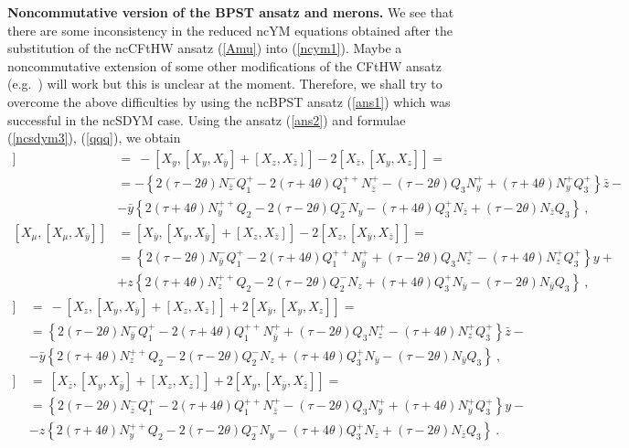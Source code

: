 \documentclass[a4paper,11pt]{article}
\numberwithin{equation}{section}
\def\th{\theta}
\def\m{\mu}
\newcommand{\zb}{{\bar{z}}}
\newcommand{\yb}{{\bar{y}}}
\begin{document}
{\bf Noncommutative version of the BPST ansatz and merons.}
We see that there are some inconsistency in the reduced ncYM equations obtained
after the substitution of the ncCFtHW ansatz (\ref{Amu}) into (\ref{ncym1}).
Maybe a noncommutative extension of some other modifications of the
CFtHW ansatz (e.g.~\cite{Popov:qs}) will work but this is 
unclear at the moment. Therefore, we shall try to overcome the above difficulties by using
the  ncBPST ansatz (\ref{ans1}) which was successful in the ncSDYM case.
Using the ansatz (\ref{ans2}) and formulae (\ref{ncsdym3}), (\ref{qqq}), we obtain 
\begin{align}
[X_\m , [X_\m , X_y]]\ &=\  -[ X_y , [X_y , X_\yb] + [X_z , X_\zb] ] - 2[X_\zb ,[X_y , X_z]]=
 \nonumber\\[8pt]
 &= -\left\{ 2(\tau -2\th) N^-_\zb Q_1^+ - 2(\tau + 4\th) Q_1^{++}N^+_\zb
- (\tau - 2\th )Q_3 N^+_y  + (\tau + 4\th) N^+_yQ_3^+\right\} \zb -
\nonumber\\[8pt]
  & -  \yb \left\{ 2(\tau + 4\th)N^{++}_yQ_2 - 2(\tau -2\th )Q_2^-N_y - (\tau + 4\th )Q_3^+ N_\zb
+ (\tau - 2\th )N_\zb Q_3\right\}\ ,
\nonumber\\[8pt]
 [X_\m , [X_\m , X_\yb]] &=  [ X_\yb , [X_y , X_\yb ] + [X_z , X_\zb ] ] - 2[X_z,[X_\yb ,X_\zb]]=
\nonumber \\[8pt]
  &= \left\{ 2(\tau -2\th) N^-_\yb Q_1^+ - 2(\tau + 4\th) Q_1^{++}N^+_\yb + (\tau -2\th)Q_3 N^+_z
- (\tau + 4\th)N^+_zQ_3^+\right\} y +
\nonumber\\[8pt]
  & +  z  \left\{ 2(\tau + 4\th)N^{++}_zQ_2 - 2(\tau -2\th)Q_2^-N_z + (\tau + 4\th)Q_3^+ N_\yb
- (\tau - 2\th)N_\yb Q_3\right\}\ ,
\nonumber
\end{align}
\begin{align}
[X_\m , [X_\m , X_z]]\ &=\  - [ X_z , [X_y , X_\yb] + [X_z , X_\zb] ] + 2[X_\yb ,  [X_y , X_z] ]=
 \nonumber\\[8pt]
  &= \left\{ 2(\tau -2\th) N^-_\yb Q_1^+ - 2(\tau + 4\th) Q_1^{++}N^+_\yb + (\tau -2\th)Q_3 N^+_z
- (\tau + 4\th)N^+_zQ_3^+\right\} \zb -
\nonumber\\[8pt]
  & -  \yb  \left\{ 2(\tau + 4\th)N^{++}_zQ_2 - 2(\tau -2\th)Q_2^-N_z + (\tau + 4\th)Q_3^+ N_\yb
- (\tau - 2\th)N_\yb Q_3\right\}\ , 
 \nonumber 
\end{align}
\begin{align}
[X_\m , [X_\m , X_\zb]]\ &=\  [ X_\zb , [X_y , X_\yb] + [X_z , X_\zb] ] + 2[X_y ,[X_\yb , X_\zb]]=
 \label{XXX}\\[8pt]
 &= \left\{ 2(\tau -2\th) N^-_\zb Q_1^+ - 2(\tau + 4\th) Q_1^{++}N^+_\zb
- (\tau - 2\th )Q_3 N^+_y + (\tau + 4\th) N^+_yQ_3^+ \right\} y -
\nonumber\\[8pt]
  & -  z \left\{ 2(\tau + 4\th)N^{++}_yQ_2 - 2(\tau -2\th)Q_2^-N_y - (\tau + 4\th)Q_3^+ N_\zb
+ (\tau - 2\th)N_\zb Q_3\right\}\ .
\nonumber
\end{align}
\end{document}
